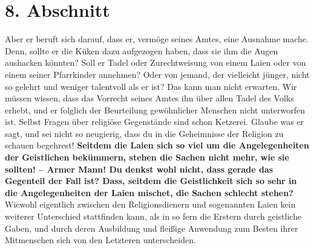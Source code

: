 \section{8. Abschnitt} \label{kap12_ab8}

Aber er beruft sich darauf, dass er, vermöge seines
Amtes, eine
Ausnahme mache.
Denn, sollte er die Küken dazu aufgezogen haben, dass sie ihm die Augen
aushacken könnten? Soll er Tadel oder Zurechtweisung von einem
Laien oder von
einem seiner Pfarrkinder annehmen? Oder von jemand, der vielleicht jünger, nicht
so gelehrt und weniger talentvoll als er ist? Das kann man nicht erwarten. Wir
müssen wissen, dass das Vorrecht seines Amtes ihn über allen Tadel des Volks
erhebt, und er folglich der Beurteilung gewöhnlicher Menschen nicht unterworfen
ist. Selbst Fragen über religiöse Gegenstände sind schon
Ketzerei. Glaube was er
sagt, und sei nicht so neugierig, dass du in die Geheimnisse der
Religion zu
schauen begehrest! \label{ref:12_08_eitle_menschen_leihen_vs_geisltichkeit}
\textbf{Seitdem die Laien sich so viel um die Angelegenheiten
der
Geistlichen bekümmern, stehen die Sachen nicht mehr, wie sie sollten! -- Armer
Mann! Du denkst wohl nicht, dass gerade das Gegenteil der Fall ist? Dass,
seitdem
die Geistlichkeit sich so sehr in die Angelegenheiten der Laien mischet, die
Sachen schlecht stehen?} Wiewohl eigentlich zwischen den Religionsdienern und
sogenannten Laien kein weiterer Unterschied stattfinden kann, als in so fern
die Erstern durch geistliche Gaben, und durch deren Ausbildung und fleißige
Anwendung zum Besten ihrer Mitmenschen sich von den Letzteren unterscheiden.

